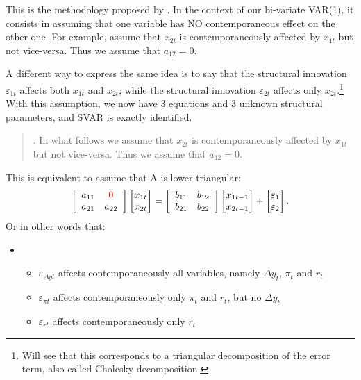 \documentclass[11pt,a4paper]{report}
\numberwithin{equation}{chapter}
\numberwithin{section}{chapter}
\begin{document}
This is the methodology proposed by \cite{Sims1980}. In the context of our
bi-variate VAR(1), it consists in assuming that one variable has NO
contemporaneous effect on the other one. For example, assume that $x_{2t}$
is contemporaneously affected by $x_{1t}$ but not vice-versa. Thus we assume
that $a_{12}=0$.

A different way to express the same idea is to say that the structural
innovation $\varepsilon _{1t}$ affects both $x_{1t}$ and $x_{2t}$; while the
structural innovation $\varepsilon _{2t}$ affects only $x_{2t}$.\footnote{%
Will see that this corresponds to a triangular decomposition of the error
term, also called Cholesky decomposition.} With this assumption, we now have
3 equations and 3 unknown structural parameters, and SVAR is exactly
identified.

\begin{quotation}
{%
%
.} In what follows we assume that $x_{2t}$ is contemporaneously affected by $%
x_{1t}$ but not vice-versa. Thus we assume that $a_{12}=0.$
\end{quotation}

This is equivalent to assume that A is lower triangular:%
\begin{equation*}
\left[ 
\begin{array}{cc}
a_{11} & {%
\color{red}%
{0}} \\ 
a_{21} & a_{22}%
\end{array}%
\right] 
\begin{bmatrix}
x_{1t} \\ 
x_{2t}%
\end{bmatrix}%
=\left[ 
\begin{array}{cc}
b_{11} & b_{12} \\ 
b_{21} & b_{22}%
\end{array}%
\right] 
\begin{bmatrix}
x_{1t-1} \\ 
x_{2t-1}%
\end{bmatrix}%
+%
\begin{bmatrix}
\varepsilon _{1} \\ 
\varepsilon _{2}%
\end{bmatrix}%
.
\end{equation*}%
Or in other words that:

\begin{itemize}
\item 
\begin{itemize}
\item $\varepsilon _{\Delta yt}$ affects contemporaneously all variables,
namely $\Delta y_{t}$, $\pi _{t}$ and $r_{t}$

\item $\varepsilon _{\pi t}$ affects contemporaneously only $\pi _{t}$ and $%
r_{t}$, but no $\Delta y_{t}$

\item $\varepsilon _{rt}$ affects contemporaneously only $r_{t}$
\end{itemize}
\end{itemize}
\end{document}
